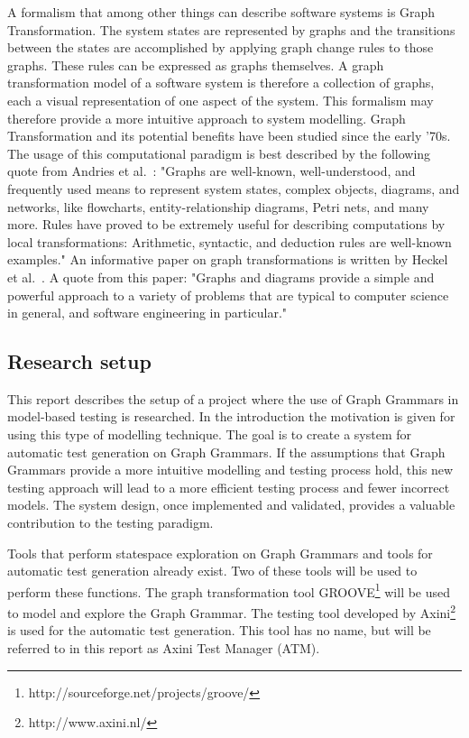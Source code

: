 A formalism that among other things can describe software systems is Graph Transformation. The system states are represented by graphs and the transitions between the states are accomplished by applying graph change rules to those graphs. These rules can be expressed as graphs themselves. A graph transformation model of a software system is therefore a collection of graphs, each a visual representation of one aspect of the system. This formalism may therefore provide a more intuitive approach to system modelling. Graph Transformation and its potential benefits have been studied since the early '70s. The usage of this computational paradigm is best described by the following quote from Andries et al.~\cite{Andries1999}: "Graphs are well-known, well-understood, and frequently used means to represent system states, complex objects, diagrams, and networks, like flowcharts, entity-relationship diagrams, Petri nets, and many more. Rules have proved to be extremely useful for describing computations by local transformations: Arithmetic, syntactic, and deduction rules are well-known examples." An informative paper on graph transformations is written by Heckel et al.~\cite{Heckel2006187}. A quote from this paper: "Graphs and diagrams provide a simple and powerful approach to a variety of problems that are typical to computer science in general, and software engineering in particular."

\subsection{Research setup}
This report describes the setup of a project where the use of Graph Grammars in model-based testing is researched. In the introduction the motivation is given for using this type of modelling technique. The goal is to create a system for automatic test generation on Graph Grammars. If the assumptions that Graph Grammars provide a more intuitive modelling and testing process hold, this new testing approach will lead to a more efficient testing process and fewer incorrect models. The system design, once implemented and validated, provides a valuable contribution to the testing paradigm.

Tools that perform statespace exploration on Graph Grammars and tools for automatic test generation already exist. Two of these tools will be used to perform these functions. The graph transformation tool GROOVE\footnote{http://sourceforge.net/projects/groove/} will be used to model and explore the Graph Grammar. The testing tool developed by Axini\footnote{http://www.axini.nl/} is used for the automatic test generation. This tool has no name, but will be referred to in this report as Axini Test Manager (ATM).

